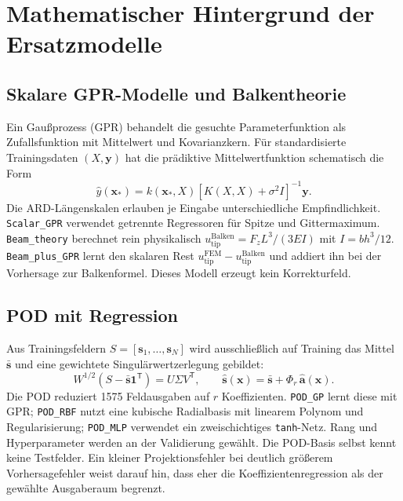 \documentclass[11pt,a4paper]{article}
\begin{document}
\section{Mathematischer Hintergrund der Ersatzmodelle}
\subsection{Skalare GPR-Modelle und Balkentheorie}
Ein Gaußprozess (GPR) behandelt die gesuchte Parameterfunktion als Zufallsfunktion mit Mittelwert und Kovarianzkern. Für standardisierte Trainingsdaten $(X,\boldsymbol y)$ hat die prädiktive Mittelwertfunktion schematisch die Form
\begin{equation}
 \widehat y(\boldsymbol x_*)=k(\boldsymbol x_*,X)
 [K(X,X)+\sigma^2 I]^{-1}\boldsymbol y.
\end{equation}
Die ARD-Längenskalen erlauben je Eingabe unterschiedliche Empfindlichkeit. \texttt{Scalar\_GPR} verwendet getrennte Regressoren für Spitze und Gittermaximum. \texttt{Beam\_theory} berechnet rein physikalisch $u_{\mathrm{tip}}^{\mathrm{Balken}}=F_z L^3/(3EI)$ mit $I=bh^3/12$. \texttt{Beam\_plus\_GPR} lernt den skalaren Rest $u_{\mathrm{tip}}^{\mathrm{FEM}}-u_{\mathrm{tip}}^{\mathrm{Balken}}$ und addiert ihn bei der Vorhersage zur Balkenformel. Dieses Modell erzeugt kein Korrekturfeld.

\subsection{POD mit Regression}
Aus Trainingsfeldern $S=[\boldsymbol s_1,\ldots,\boldsymbol s_N]$ wird ausschließlich auf Training das Mittel $\bar{\boldsymbol s}$ und eine gewichtete Singulärwertzerlegung gebildet:
\begin{equation}
 W^{1/2}(S-\bar{\boldsymbol s}\boldsymbol1^\mathsf T)=U\Sigma V^\mathsf T,\qquad
 \widehat{\boldsymbol s}(\boldsymbol x)
 =\bar{\boldsymbol s}+\Phi_r\,\widehat{\boldsymbol a}(\boldsymbol x).
\end{equation}
Die POD reduziert 1575 Feldausgaben auf $r$ Koeffizienten. \texttt{POD\_GP} lernt diese mit GPR; \texttt{POD\_RBF} nutzt eine kubische Radialbasis mit linearem Polynom und Regularisierung; \texttt{POD\_MLP} verwendet ein zweischichtiges \texttt{tanh}-Netz. Rang und Hyperparameter werden an der Validierung gewählt. Die POD-Basis selbst kennt keine Testfelder. Ein kleiner Projektionsfehler bei deutlich größerem Vorhersagefehler weist darauf hin, dass eher die Koeffizientenregression als der gewählte Ausgaberaum begrenzt.
\end{document}
